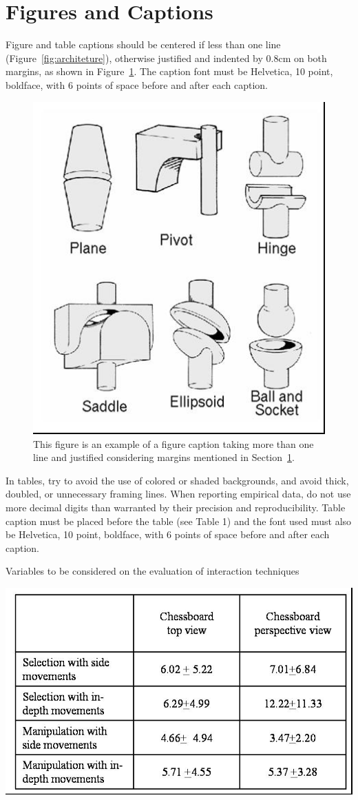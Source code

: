 \documentclass[12pt]{article}
\begin{document}
\section{Figures and Captions}\label{sec:figs}


Figure and table captions should be centered if less than one line
(Figure~\ref{fig:architeture}), otherwise justified and indented by 0.8cm on
both margins, as shown in Figure~\ref{fig:exampleFig2}. The caption font must
be Helvetica, 10 point, boldface, with 6 points of space before and after each
caption.

\begin{figure}[ht]
\centering
\includegraphics[width=.3\textwidth]{fig2.jpg}
\caption{This figure is an example of a figure caption taking more than one
  line and justified considering margins mentioned in Section~\ref{sec:figs}.}
\label{fig:exampleFig2}
\end{figure}

In tables, try to avoid the use of colored or shaded backgrounds, and avoid
thick, doubled, or unnecessary framing lines. When reporting empirical data,
do not use more decimal digits than warranted by their precision and
reproducibility. Table caption must be placed before the table (see Table 1)
and the font used must also be Helvetica, 10 point, boldface, with 6 points of
space before and after each caption.

\begin{table}[ht]
\centering
\caption{Variables to be considered on the evaluation of interaction
  techniques}
\label{tab:exTable1}
\includegraphics[width=.7\textwidth]{table.jpg}
\end{table}
\end{document}
